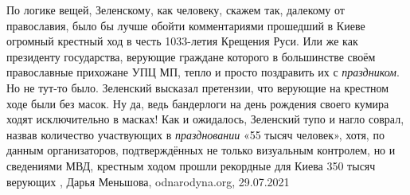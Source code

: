По логике вещей, Зеленскому, как человеку, скажем так, далекому от православия,
было бы лучше обойти комментариями прошедший в Киеве огромный крестный ход в
честь 1033-летия Крещения Руси. Или же как президенту государства, верующие
граждане которого в большинстве своём православные прихожане УПЦ МП, тепло и
просто поздравить их с \emph{праздником}.  Но не тут-то было.  Зеленский
высказал претензии, что верующие на крестном ходе были без масок. Ну да, ведь
бандерлоги на день рождения своего кумира ходят исключительно в масках! Как и
ожидалось, Зеленский тупо и нагло соврал, назвав количество участвующих в
\emph{праздновании} «55 тысяч человек», хотя, по данным организаторов,
подтверждённых не только визуальным контролем, но и сведениями МВД, крестным
ходом прошли рекордные для Киева 350 тысяч верующих
, 
Дарья Меньшова, odnarodyna.org, 29.07.2021

